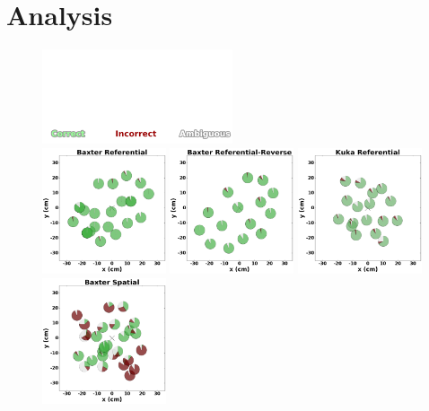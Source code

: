 \section{Analysis}
\label{analysis}

\begin{figure}[th!]

    \centering
    \includegraphics[width=0.5\textwidth, trim={0 0 0 3.3in},clip ] {figures/labels.png}\\
    \includegraphics[width=0.325\textwidth ] {figures/baxter_Referential_.png}
    \includegraphics[width=0.325\textwidth ] {figures/baxter_Referential-Reverse_.png}
    \includegraphics[width=0.325\textwidth ]{figures/kuka_Referential_.png}
    \includegraphics[width=0.325\textwidth ]{figures/baxter_Spatial_.png}

\end{figure}
